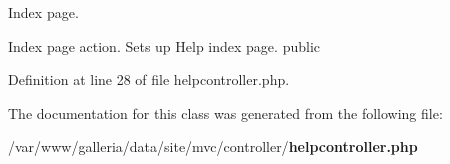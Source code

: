 Index page.

Index page action. Sets up Help index page.  public 

Definition at line 28 of file helpcontroller.php.

The documentation for this class was generated from the following file:\begin{CompactItemize}
\item 
/var/www/galleria/data/site/mvc/controller/{\bf helpcontroller.php}\end{CompactItemize}

